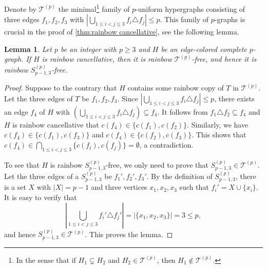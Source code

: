 \documentclass[10pt,a4paper]{article}
\newtheorem{lemma}[theorem]{Lemma}
\theoremstyle{definition}
\newcommand{\cT}{\mathcal{T}}
\begin{document}
Denote by $\cT^{(p)}$ the minimal\footnote{In the sense that if $H_1\subsetneq H_2$ and $H_2\in\cT^{(p)}$, then $H_1\notin \cT^{(p)}$.} family of $p$-uniform hypergraphs consisting of three edges $f_1,f_2,f_3$ with $\left|\bigcup_{1\le i<j\le 3}f_i\triangle f_j\right|\le p$.
This family of $p$-graphs is crucial in the proof of \cref{thm:rainbow cancellative}, see the following lemma.
\begin{lemma}\label{lem:rainbow triple}
    Let $p$ be an integer with $p\ge3$ and $H$ be an edge-colored complete $p$-graph.
    If $H$ is rainbow cancellative, then it is rainbow $\cT^{(p)}$-free, and hence it is rainbow $S^{(p)}_{p-1,3}$-free.
\end{lemma}

\begin{proof}
    Suppose to the contrary that $H$ contains some rainbow copy of $T$ in $\cT^{(p)}$.
    Let the three edges of $T$ be $f_1,f_2,f_3$.
    Since $\left|\bigcup_{1\le i<j\le 3}f_i\triangle f_j\right|\le p$, there exists an edge $f_4$ of $H$ with $\left(\bigcup_{1\le i<j\le 3}f_i\triangle f_j\right)\subseteq f_4$.
    It follows from $f_1\triangle f_2\subseteq f_4$ and $H$ is rainbow cancellative that $c(f_4)\in\{c(f_1),c(f_2)\}$.
    Similarly, we have $c(f_4)\in\{c(f_1),c(f_3)\}$ and $c(f_4)\in\{c(f_2),c(f_3)\}$.
    This shows that $c(f_4)\in \bigcap_{1\le i<j\le 3}\{c(f_i),c(f_j)\}=\emptyset$, a contradiction.

    To see that $H$ is rainbow $S^{(p)}_{p-1,3}$-free, we only need to prove that $S^{(p)}_{p-1,3}\in \cT^{(p)}$.
    Let the three edges of a $S^{(p)}_{p-1,3}$ be $f_1',f_2',f_3'$.
    By the definition of $S^{(p)}_{p-1,3}$, there is a set $X$ with $|X|=p-1$ and three vertices $x_1,x_2,x_3$ such that $f_i'=X\cup\{x_i\}$.
    It is easy to verify that
    \[
        \left|\bigcup_{1\le i<j\le 3}f_i'\triangle f_j'\right|=\left|\{x_1,x_2,x_3\}\right|=3\le p,
    \]
    and hence $S^{(p)}_{p-1,3}\in \cT^{(p)}$.
    This proves the lemma.
\end{proof}
\end{document}
